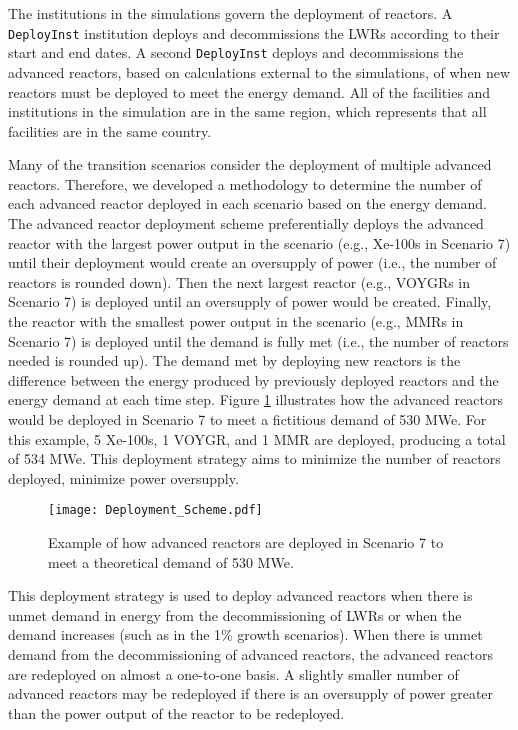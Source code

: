 The institutions in the simulations 
govern the deployment of reactors. A \Cycamore \texttt{DeployInst} 
institution \cite{huff_fundamental_2016} deploys and decommissions the 
\glspl{LWR} according to their start and end dates. A second \Cycamore 
\texttt{DeployInst} deploys and decommissions the advanced reactors, 
based on calculations external to the \Cyclus simulations, of when 
new reactors must be deployed to meet the energy 
demand. All of the facilities and institutions in the simulation are in 
the same region, which represents that all facilities are in the same 
country. 

Many of the transition scenarios consider the deployment of 
multiple advanced reactors. Therefore, we developed a methodology 
to determine the number of each advanced reactor deployed in each 
scenario based on the energy demand. 
The advanced reactor deployment scheme preferentially deploys the advanced 
reactor with the largest power output in the scenario (e.g., Xe-100s in 
Scenario 7) until their deployment would create an oversupply of power
(i.e., the number of reactors is rounded down). 
Then the next largest reactor (e.g., VOYGRs in Scenario 7) is deployed 
until an oversupply of power would be 
created. Finally, the reactor 
with the smallest power output in the scenario (e.g., \glspl{MMR} in 
Scenario 7) is deployed until the demand is fully met (i.e., the number of 
reactors needed is rounded up). The demand 
met by deploying new reactors is the difference between the energy 
produced by previously deployed reactors and the energy demand at each 
time step. 
Figure \ref{fig:AR_deployment} illustrates how the advanced reactors 
would be deployed in Scenario 7 to meet a fictitious demand of 530 MWe. For this 
example, 5 Xe-100s, 1 VOYGR, and 1 \gls{MMR} are deployed, producing a 
total of 534 MWe. This deployment 
strategy aims to minimize the number of reactors deployed,  
minimize power oversupply.

\begin{figure}[ht]
    \centering
    \texttt{[image: Deployment\_Scheme.pdf]}
    \caption{Example of how advanced reactors are deployed in Scenario 7 
    to meet a theoretical demand of 530 MWe.}
    \label{fig:AR_deployment}
\end{figure}

This deployment strategy is used to deploy advanced reactors when there is
unmet demand in energy from the decommissioning of \glspl{LWR} or 
when the demand increases (such as in the 1\% growth scenarios). When 
there is unmet demand from the decommissioning of advanced reactors, the 
advanced reactors are redeployed on almost a one-to-one basis. A slightly
smaller number of advanced reactors may be redeployed if there is an 
oversupply of power greater than the power output of the reactor to be 
redeployed. 

